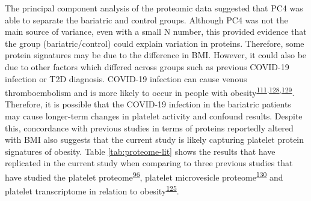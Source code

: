 \documentclass[11pt,twoside]{bristolthesis}
\begin{document}
The principal component analysis of the proteomic data suggested that PC4 was able to separate the bariatric and control groups. Although PC4 was not the main source of variance, even with a small N number, this provided evidence that the group (bariatric/control) could explain variation in proteins. Therefore, some protein signatures may be due to the difference in BMI. However, it could also be due to other factors which differed across groups such as previous COVID-19 infection or T2D diagnosis. COVID-19 infection can cause venous thromboembolism and is more likely to occur in people with obesity\textsuperscript{\protect\hyperlink{ref-Klok2020}{111},\protect\hyperlink{ref-McFadyen2020}{128},\protect\hyperlink{ref-Wang2021}{129}}. Therefore, it is possible that the COVID-19 infection in the bariatric patients may cause longer-term changes in platelet activity and confound results. Despite this, concordance with previous studies in terms of proteins reportedly altered with BMI also suggests that the current study is likely capturing platelet protein signatures of obesity. Table \ref{tab:proteome-lit} shows the results that have replicated in the current study when comparing to three previous studies that have studied the platelet proteome\textsuperscript{\protect\hyperlink{ref-Barrachina2019}{96}}, platelet microvesicle proteome\textsuperscript{\protect\hyperlink{ref-Grande2019}{130}} and platelet transcriptome in relation to obesity\textsuperscript{\protect\hyperlink{ref-Freedman2010}{125}}.
\end{document}
